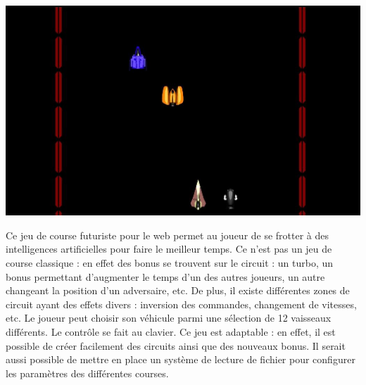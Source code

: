 \begin{minipage}{6cm}
 \includegraphics[width=\linewidth]{img/capturejeu_course}
\end{minipage}
\hfill
\begin{minipage}{9cm}
Ce jeu de course futuriste pour le web permet au joueur de se frotter à des intelligences artificielles pour faire le meilleur temps. 
Ce  n’est pas un jeu de course classique : en effet des bonus se trouvent sur le circuit :
un turbo, un bonus permettant d’augmenter le temps d’un des autres joueurs, un autre changeant la position d'un adversaire, etc. 
De plus, il existe différentes zones de circuit ayant des effets divers : inversion des commandes, changement de vitesses, etc.
Le joueur peut choisir son véhicule parmi une sélection de 12 vaisseaux différents. 
Le contrôle se fait au clavier. Ce jeu est adaptable : en effet, il est possible de créer facilement des circuits ainsi que des nouveaux bonus. 
Il serait aussi possible de mettre en place un système de lecture de fichier pour configurer les paramètres des différentes courses.
\end{minipage}

